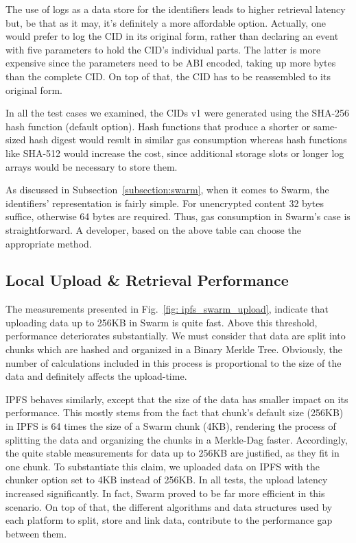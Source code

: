 The use of logs as a data store for the identifiers leads to higher retrieval latency but, be that as it may, it’s definitely a more affordable option. Actually, one would prefer to log the CID in its original form, rather than declaring an event with five parameters to hold the CID’s individual parts. The latter is more expensive since the parameters need to be ABI encoded, taking up more bytes than the complete CID. On top of that, the CID has to be reassembled to its original form.

In all the test cases we examined, the CIDs v1 were generated using the SHA-256 hash function (default option). Hash functions that produce a shorter or same-sized hash digest would result in similar gas consumption whereas hash functions like SHA-512 would increase the cost, since additional storage slots or longer log arrays would be necessary to store them.

As discussed in Subsection~\ref{subsection:swarm}, when it comes to Swarm, the identifiers’ representation is fairly simple. For unencrypted content 32 bytes suffice, otherwise 64 bytes are required. Thus, gas consumption in Swarm’s case is straightforward. A developer, based on the above table can choose the appropriate method.
\subsection{Local Upload \& Retrieval Performance}\label{subsection:evaluation_local}
The measurements presented in Fig.~\ref{fig: ipfs_swarm_upload}, indicate that uploading data up to 256KB in Swarm is quite fast. Above this threshold, performance deteriorates substantially. We must consider that data are split into chunks which are hashed and organized in a Binary Merkle Tree. Obviously, the number of calculations included in this process is proportional to the size of the data and definitely affects the upload-time.

IPFS behaves similarly, except that the size of the data has smaller impact on its performance. This mostly stems from the fact that chunk’s default size (256KB) in IPFS is 64 times the size of a Swarm chunk (4KB), rendering the process of splitting the data and organizing the chunks in a Merkle-Dag faster. Accordingly, the quite stable measurements for data up to 256KB are justified, as they fit in one chunk. To substantiate this claim, we uploaded data on IPFS with the chunker option set to 4KB instead of 256KB. In all tests, the upload latency increased significantly. In fact, Swarm proved to be far more efficient in this scenario. On top of that, the different algorithms and data structures used by each platform to split, store and link data, contribute to the performance gap between them.

